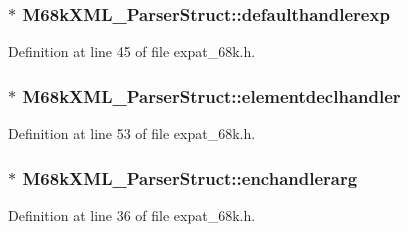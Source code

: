 \subsubsection[{\texorpdfstring{defaulthandlerexp}{defaulthandlerexp}}]{$\ast$ M68k\+X\+M\+L\+\_\+\+Parser\+Struct\+::defaulthandlerexp}\hypertarget{struct_m68k_x_m_l___parser_struct_a2e8dc761ed15facbc1c9c5f639d7f0c2}{}\label{struct_m68k_x_m_l___parser_struct_a2e8dc761ed15facbc1c9c5f639d7f0c2}


Definition at line 45 of file expat\+\_\+68k.\+h.

\subsubsection[{\texorpdfstring{elementdeclhandler}{elementdeclhandler}}]{$\ast$ M68k\+X\+M\+L\+\_\+\+Parser\+Struct\+::elementdeclhandler}\hypertarget{struct_m68k_x_m_l___parser_struct_a36a9bd68380965e99dc263ce69f2d4f3}{}\label{struct_m68k_x_m_l___parser_struct_a36a9bd68380965e99dc263ce69f2d4f3}


Definition at line 53 of file expat\+\_\+68k.\+h.

\subsubsection[{\texorpdfstring{enchandlerarg}{enchandlerarg}}]{$\ast$ M68k\+X\+M\+L\+\_\+\+Parser\+Struct\+::enchandlerarg}\hypertarget{struct_m68k_x_m_l___parser_struct_a210dce6b24d1063b6b974cc3d4d345b7}{}\label{struct_m68k_x_m_l___parser_struct_a210dce6b24d1063b6b974cc3d4d345b7}


Definition at line 36 of file expat\+\_\+68k.\+h.


